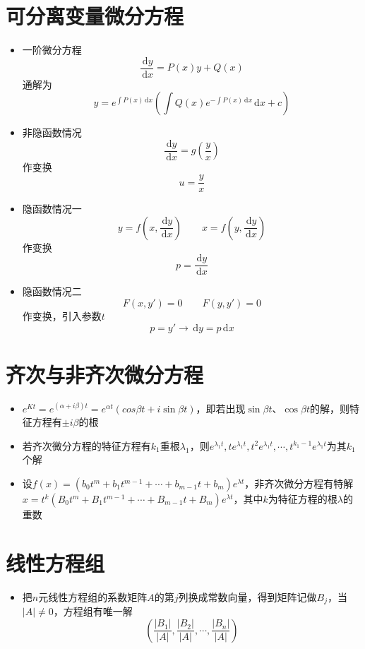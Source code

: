 \documentclass[UTF8]{ctexart}
\newcommand{\ud}{\,\mathrm{d}}
\begin{document}
\section{可分离变量微分方程}
\begin{itemize}

	\item 一阶微分方程
	\[
		\frac{\ud y}{\ud x} = P(x)y + Q(x)
	\]
	通解为
	\[
		y=e^{\int P(x)\ud x}(\int Q(x)e^{-\int P(x)\ud x}\ud x+c)
	\]

	\item 非隐函数情况
	\[
		\frac{\ud y}{\ud x} = g(\frac{y}{x})
	\]
	作变换
	\[
		u = \frac{y}{x}
	\]
	

	\item 隐函数情况一
	\[
		y = f(x,\frac{\ud y}{\ud x}) \qquad x = f(y,\frac{\ud y}{\ud x})
	\]
	作变换
	\[
		p = \frac{\ud y}{\ud x}
	\]

	\item 隐函数情况二
	\[
		F(x,y') = 0 \qquad F(y,y') = 0
	\]
	作变换，引入参数$t$
	\[
		p = y' \rightarrow \ud y = p \ud x
	\]

\end{itemize}

\section{齐次与非齐次微分方程}
\begin{itemize}

	\item $e^{Kt} = e^{(\alpha+i\beta)t}=e^{\alpha t}(cos\beta t + i\sin \beta t)$，即若出现$\sin\beta t$、$\cos \beta t$的解，则特征方程有$\pm i\beta$的根

	\item 若齐次微分方程的特征方程有$k_1$重根$\lambda_1$，则$e^{\lambda_1t},te^{\lambda_1t},t^2e^{\lambda_1t},\cdots,t^{k_1-1}e^{\lambda_1t}$为其$k_1$个解

	\item 设$f(x)=(b_0t^m+b_1t^{m-1}+\cdots+b_{m-1}t+b_m)e^{\lambda t}$，非齐次微分方程有特解$x=t^k(B_0t^m+B_1t^{m-1}+\cdots+B_{m-1}t+B_m)e^{\lambda t}$，其中$k$为特征方程的根$\lambda$的重数
\end{itemize}

\section{线性方程组}
\begin{itemize}

	\item 把$n$元线性方程组的系数矩阵$A$的第$j$列换成常数向量，得到矩阵记做$B_j$，当$|A|\neq 0$，方程组有唯一解
	\[
		\left(\frac{|B_1|}{|A|},\frac{|B_2|}{|A|},\cdots,\frac{|B_n|}{|A|} \right)
	\]

\end{itemize}
\end{document}
